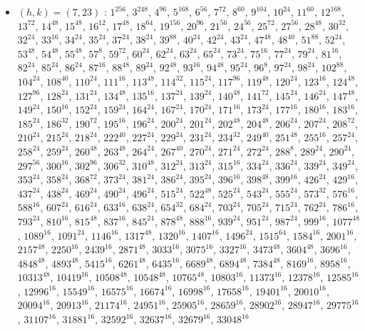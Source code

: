 \begin{itemize}
\item $(h,k)=(7,23)$ : $1^{256}$, $3^{248}$, $4^{96}$, $5^{168}$, $6^{56}$, $7^{72}$, $8^{60}$, $9^{104}$, $10^{24}$, $11^{60}$, $12^{168}$, $13^{72}$, $14^{48}$, $15^{48}$, $16^{12}$, $17^{48}$, $18^{64}$, $19^{156}$, $20^{96}$, $21^{56}$, $24^{56}$, $25^{72}$, $27^{56}$, $28^{48}$, $30^{32}$, $32^{24}$, $33^{16}$, $34^{24}$, $35^{24}$, $37^{24}$, $38^{24}$, $39^{88}$, $40^{24}$, $42^{24}$, $43^{24}$, $47^{48}$, $48^{40}$, $51^{88}$, $52^{24}$, $53^{48}$, $54^{48}$, $55^{48}$, $57^{8}$, $59^{72}$, $60^{24}$, $62^{24}$, $63^{24}$, $65^{24}$, $73^{24}$, $75^{16}$, $77^{24}$, $79^{24}$, $81^{16}$, $82^{24}$, $85^{24}$, $86^{24}$, $87^{16}$, $88^{48}$, $89^{24}$, $92^{48}$, $93^{16}$, $94^{48}$, $95^{24}$, $96^{8}$, $97^{24}$, $98^{24}$, $102^{88}$, $104^{24}$, $108^{40}$, $110^{24}$, $111^{16}$, $113^{48}$, $114^{32}$, $115^{24}$, $117^{96}$, $119^{48}$, $120^{24}$, $123^{16}$, $124^{48}$, $127^{96}$, $128^{24}$, $131^{24}$, $134^{48}$, $135^{16}$, $137^{24}$, $139^{24}$, $140^{48}$, $141^{72}$, $145^{24}$, $146^{24}$, $147^{48}$, $149^{24}$, $150^{16}$, $152^{24}$, $159^{24}$, $164^{24}$, $167^{24}$, $170^{24}$, $171^{16}$, $173^{24}$, $177^{16}$, $180^{16}$, $183^{16}$, $185^{24}$, $186^{32}$, $190^{72}$, $195^{16}$, $196^{24}$, $200^{24}$, $201^{24}$, $202^{48}$, $204^{48}$, $206^{24}$, $207^{24}$, $208^{72}$, $210^{24}$, $215^{24}$, $218^{24}$, $222^{40}$, $227^{24}$, $229^{24}$, $231^{24}$, $234^{32}$, $249^{40}$, $251^{48}$, $255^{16}$, $257^{24}$, $258^{24}$, $259^{24}$, $260^{48}$, $263^{48}$, $264^{24}$, $267^{40}$, $270^{24}$, $271^{24}$, $272^{24}$, $288^{8}$, $289^{24}$, $290^{24}$, $297^{56}$, $300^{16}$, $302^{96}$, $306^{32}$, $310^{48}$, $312^{24}$, $313^{24}$, $315^{16}$, $334^{24}$, $336^{24}$, $339^{24}$, $349^{24}$, $353^{24}$, $358^{24}$, $368^{72}$, $373^{24}$, $381^{24}$, $386^{24}$, $395^{24}$, $396^{16}$, $398^{48}$, $399^{16}$, $426^{24}$, $429^{16}$, $437^{24}$, $438^{24}$, $469^{24}$, $490^{24}$, $496^{24}$, $515^{24}$, $522^{48}$, $525^{24}$, $543^{24}$, $555^{24}$, $573^{32}$, $576^{16}$, $588^{16}$, $607^{24}$, $616^{24}$, $633^{16}$, $638^{24}$, $654^{32}$, $684^{24}$, $703^{24}$, $705^{24}$, $715^{24}$, $762^{24}$, $786^{16}$, $793^{24}$, $810^{16}$, $815^{48}$, $837^{16}$, $845^{24}$, $878^{48}$, $888^{16}$, $939^{24}$, $951^{24}$, $987^{24}$, $999^{16}$, $1077^{48}$, $1089^{16}$, $1091^{24}$, $1146^{16}$, $1317^{48}$, $1320^{16}$, $1407^{16}$, $1496^{24}$, $1515^{64}$, $1584^{16}$, $2001^{16}$, $2157^{48}$, $2250^{16}$, $2439^{16}$, $2871^{48}$, $3033^{16}$, $3075^{16}$, $3327^{16}$, $3473^{48}$, $3604^{48}$, $3696^{16}$, $4848^{48}$, $4893^{48}$, $5415^{16}$, $6261^{48}$, $6435^{16}$, $6689^{48}$, $6894^{48}$, $7384^{48}$, $8169^{16}$, $8958^{16}$, $10313^{48}$, $10419^{16}$, $10508^{48}$, $10548^{48}$, $10765^{48}$, $10803^{16}$, $11373^{16}$, $12378^{16}$, $12585^{16}$, $12996^{16}$, $15549^{16}$, $16575^{16}$, $16674^{16}$, $16998^{16}$, $17658^{16}$, $19401^{16}$, $20010^{16}$, $20094^{16}$, $20913^{16}$, $21174^{16}$, $24951^{16}$, $25905^{16}$, $28659^{16}$, $28902^{16}$, $28947^{16}$, $29775^{16}$, $31107^{16}$, $31881^{16}$, $32592^{16}$, $32637^{16}$, $32679^{16}$, $33048^{16}$

\end{itemize}
